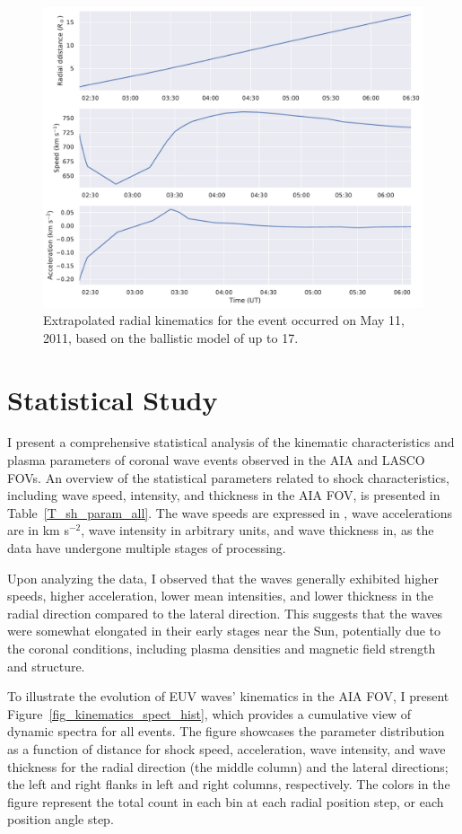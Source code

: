 \begin{figure}[!htp] %
	\centerline{\includegraphics[width=0.8\columnwidth]{chapter2/figs/radial_kinematics_aia_lasco_110511_01.pdf}}
	\caption{Extrapolated radial kinematics for the event occurred on May 11, 2011, based on the ballistic model of \cite{gallagher_2003} up to 17\rsun.}
	\label{fig_rad_kinematics_aialasco_110511}
\end{figure}

\section{Statistical Study}
I present a comprehensive statistical analysis of the kinematic characteristics and plasma parameters of coronal wave events observed in the AIA and LASCO FOVs.
An overview of the statistical parameters related to shock characteristics, including wave speed, intensity, and thickness in the AIA FOV, is presented in Table~\ref{T_sh_param_all}. The wave speeds are expressed in \kms, wave accelerations are in km s$^{-2}$, wave intensity in arbitrary units, and wave thickness in\rsun, as the data have undergone multiple stages of processing.

Upon analyzing the data, I observed that the waves generally exhibited higher speeds, higher acceleration, lower mean intensities, and lower thickness in the radial direction compared to the lateral direction. This suggests that the waves were somewhat elongated in their early stages near the Sun, potentially due to the coronal conditions, including plasma densities and magnetic field strength and structure.

To illustrate the evolution of EUV waves' kinematics in the AIA FOV, I present Figure~\ref{fig_kinematics_spect_hist}, which provides a cumulative view of dynamic spectra for all events. The figure showcases the parameter distribution as a function of distance for shock speed, acceleration, wave intensity, and wave thickness for the radial direction (the middle column) and the lateral directions; the left and right flanks in left and right columns, respectively. The colors in the figure represent the total count in each bin at each radial position step, or each position angle step.

